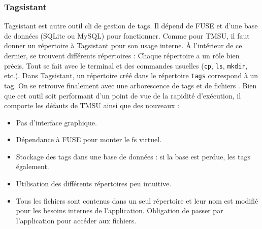 \documentclass[a4paper, 12pt]{article}
\begin{document}
\subsubsection{Tagsistant}
Tagsistant \cite{ref16} est autre outil \acrshort{cli} de gestion de tags. Il dépend de FUSE et d'une base 
de données (SQLite ou MySQL) pour fonctionner. Comme pour TMSU, il faut donner un répertoire à Tagsistant 
pour son usage interne. À l'intérieur de ce dernier, se trouvent différents répertoires :
\bigbreak
Chaque répertoire a un rôle bien précis. Tout se fait avec le terminal et des commandes usuelles 
(\texttt{cp}, \texttt{ls}, \texttt{mkdir}, etc.). Dans Tagsistant, 
un répertoire créé dans le répertoire \texttt{tags} correspond à un tag. On se retrouve 
finalement avec une arborescence de tags et de fichiers \cite{ref17}. Bien que cet outil soit 
performant d'un point de vue de la rapidité d'exécution, il comporte les défauts de TMSU ainsi que 
des nouveaux :
\begin{itemize}
    \item Pas d'interface graphique.
    \item Dépendance à FUSE pour monter le \acrshort{fs} virtuel.
    \item Stockage des tags dans une base de données : si la base est perdue, les tags également.
    \item Utilisation des différents répertoires peu intuitive.
    \item Tous les fichiers sont contenus dans un seul répertoire et leur nom est modifié pour les 
        besoins internes de l'application. Obligation de passer par l'application pour accéder aux 
        fichiers.
\end{itemize} 
\end{document}
